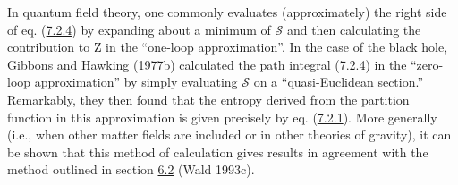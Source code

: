 \documentclass[11pt,a4paper]{article}
\begin{document}
In quantum field theory, one commonly evaluates (approximately) the right side of eq. (\hyperref[eq:7.2.4]{7.2.4}) by expanding about a minimum of \(\mathcal{S}\) and then calculating the contribution to Z in the ``one-loop approximation''. In the case of the black hole, Gibbons and Hawking (1977b) calculated the path integral (\hyperref[eq:7.2.4]{7.2.4}) in the ``zero-loop approximation'' by simply evaluating \(\mathcal{S}\) on a ``quasi-Euclidean \hypertarget{source-178}{} section.'' Remarkably, they then found that the entropy derived from the partition function in this approximation is given precisely by eq. (\hyperref[eq:7.2.1]{7.2.1}). More generally (i.e., when other matter fields are included or in other theories of gravity), it can be shown that this method of calculation gives results in agreement with the method outlined in section \hyperlink{sec:6.2}{6.2} (Wald 1993c).
\end{document}

